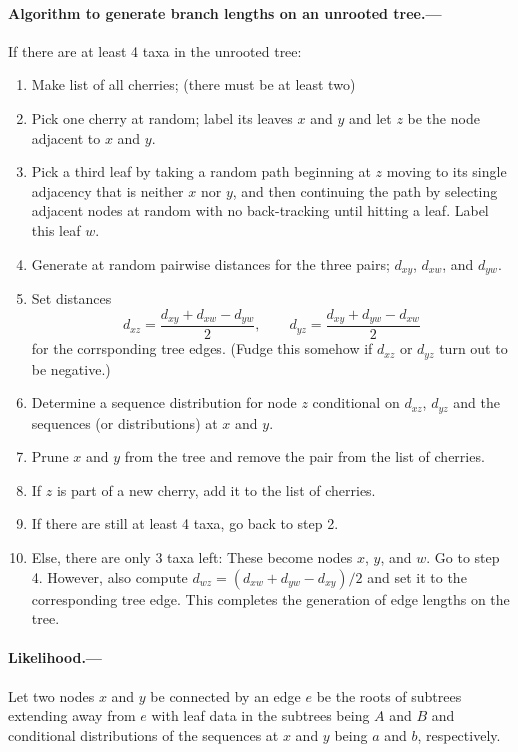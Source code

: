 \documentclass[12pt,letterpaper]{article}
\begin{document}
\paragraph{Algorithm to generate branch lengths on an unrooted tree.---}
If there are at least 4 taxa in the unrooted tree:
\begin{enumerate}
\item Make list of all cherries; (there must be at least two)
\item Pick one cherry at random; label its leaves $x$ and $y$ and let $z$ be the node adjacent to $x$ and $y$.
\item Pick a third leaf by taking a random path beginning at $z$ moving to its single adjacency that is neither $x$ nor $y$,
and then continuing the path by selecting adjacent nodes at random with no back-tracking until hitting a leaf.
Label this leaf $w$.
\item Generate at random pairwise distances for the three pairs; $d_{xy}$, $d_{xw}$, and $d_{yw}$.
\item Set distances
$$
d_{xz} = \frac{d_{xy} + d_{xw} - d_{yw}}{2}, \qquad d_{yz} = \frac{d_{xy} + d_{yw} - d_{xw}}{2}
$$
for the corrsponding tree edges.
(Fudge this somehow if $d_{xz}$ or $d_{yz}$ turn out to be negative.)
\item Determine a sequence distribution for node $z$ conditional on $d_{xz}$, $d_{yz}$ and the sequences (or distributions) at $x$ and $y$.
\item Prune $x$ and $y$ from the tree and remove the pair from the list of cherries.
\item If $z$ is part of a new cherry, add it to the list of cherries.
\item If there are still at least 4 taxa,
go back to step 2.
\item Else, there are only 3 taxa left:
These become nodes $x$, $y$, and $w$.
Go to step 4.
However, also compute $d_{wz} = (d_{xw} + d_{yw} - d_{xy})/2$ and set it to the corresponding tree edge.
This completes the generation of edge lengths on the tree.
\end{enumerate}

\paragraph{Likelihood.---}
Let two nodes $x$ and $y$ be connected by an edge $e$ be the roots of subtrees extending away from $e$
with leaf data in the subtrees being $A$ and $B$
and conditional distributions of the sequences at $x$ and $y$ being $a$ and $b$, respectively.
\end{document}
